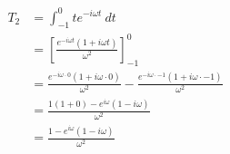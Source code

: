 \documentclass[preview]{standalone}
\begin{document}
\begin{align*}
T_{2} &=\int_{-1}^{0}t e^{-i\omega t} \ dt \\ &=\left[\frac{e^{-i\omega t}(1+i\omega t)}{\omega^{2}}\right]_{-1}^{0} \\ &=\frac{e^{-i\omega\cdot 0}(1+i\omega\cdot 0)}{\omega^{2}}-\frac{e^{-i\omega\cdot -1}(1+i\omega\cdot -1)}{\omega^{2}} \\ &=\frac{1(1+0)-e^{i\omega}(1-i\omega)}{\omega^{2}} \\ &= \frac{1-e^{i\omega}(1-i\omega)}{\omega^{2}}
\end{align*}
\end{document}
